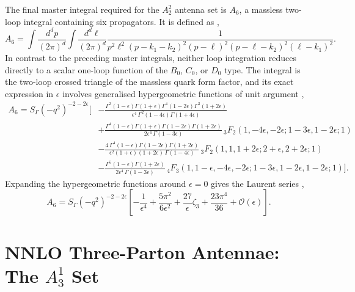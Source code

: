 The final master integral required for the $A_2^2$ antenna set is $A_6$, a massless two-loop integral
containing six propagators. It is defined as \cite{Gehrmann-DeRidder:2005btv},
\begin{equation}
    A_6 = \int\frac{d^dp}{(2\pi)^d}\int\frac{d^d\ell}{(2\pi)^d}\frac1{p^2\ell^2(p-k_1-k_2)^2(p-\ell)^2(p-\ell-k_2)^2(\ell-k_1)^2}.
\end{equation}
In contrast to the preceding master integrals, neither loop integration reduces directly to a scalar
one-loop function of the $B_0$, $C_0$, or $D_0$ type. The integral is the two-loop crossed triangle of
the massless quark form factor, and its exact expression in $\epsilon$ involves generalised
hypergeometric functions of unit argument \cite{GehrmannDeRidder0507061},
\begin{equation}\label{eq:A6exact}
    \begin{split}
        A_6 = S_\Gamma\!\left(-q^2\right)^{-2-2\epsilon}\Bigg[
        &-\frac{\Gamma^3(1-\epsilon)\Gamma(1+\epsilon)\Gamma^4(1-2\epsilon)\Gamma^3(1+2\epsilon)}{\epsilon^4\,\Gamma^2(1-4\epsilon)\Gamma(1+4\epsilon)}\\
        &+\frac{\Gamma^4(1-\epsilon)\Gamma(1+\epsilon)\Gamma(1-2\epsilon)\Gamma(1+2\epsilon)}{2\epsilon^4\,\Gamma(1-3\epsilon)}\,{}_3F_2\!\left(1,-4\epsilon,-2\epsilon;1-3\epsilon,1-2\epsilon;1\right)\\
        &-\frac{4\,\Gamma^4(1-\epsilon)\Gamma(1-2\epsilon)\Gamma(1+2\epsilon)}{\epsilon^2(1+\epsilon)(1+2\epsilon)\,\Gamma(1-4\epsilon)}\,{}_3F_2\!\left(1,1,1+2\epsilon;2+\epsilon,2+2\epsilon;1\right)\\
        &-\frac{\Gamma^5(1-\epsilon)\Gamma(1+2\epsilon)}{2\epsilon^4\,\Gamma(1-3\epsilon)}\,{}_4F_3\!\left(1,1-\epsilon,-4\epsilon,-2\epsilon;1-3\epsilon,1-2\epsilon,1-2\epsilon;1\right)\Bigg].
    \end{split}
\end{equation}
Expanding the hypergeometric functions around $\epsilon=0$ gives the Laurent series
\cite{GehrmannDeRidder0507061},
\begin{equation}
    A_6 = S_\Gamma\!\left(-q^2\right)^{-2-2\epsilon}\!\left[-\frac1{\epsilon^4}+\frac{5\pi^2}{6\epsilon^2}+\frac{27}{\epsilon}\zeta_3+\frac{23\pi^4}{36}+\mathcal O(\epsilon)\right].
\end{equation}

\section{NNLO Three-Parton Antennae: The $A_3^1$ Set}\label{sec:A31set}

